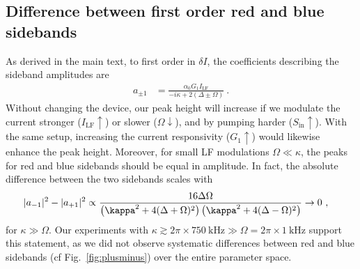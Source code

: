 \subsection{Difference between first order red and blue sidebands}\label{sec:bluered}
% 
As derived in the main text, to first order in $\delta I$, the coefficients describing the sideband amplitudes are
% 
\begin{align}
a_{\pm 1} & = \frac{\alpha_0 G_1 I_\text{LF}}{-i\kappa+2(\Delta\pm\Omega)} \ .
\label{eq:input-output-first}
\end{align}
% 
Without changing the device, our peak height will increase if we modulate the current stronger ($I_\text{LF}\uparrow$) or slower ($\Omega\downarrow$), and by pumping harder ($S_\text{in}\uparrow$).
% 
With the same setup, increasing the current responsivity ($G_1\uparrow$) would likewise enhance the peak height.
% 
Moreover, for small LF modulations $\Omega\ll\kappa$, the peaks for red and blue sidebands should be equal in amplitude.
% 
In fact, the absolute difference between the two sidebands scales with
% 
\begin{align}
\abs{a_{-1}}^2-\abs{a_{+1}}^2 &\propto \frac{16 \Delta \Omega}{\left( \kappa^2+4(\Delta+\Omega)^2 \right)\left( \kappa^2+4(\Delta-\Omega)^2 \right)} \rightarrow 0 \ ,
\end{align}
for $\kappa \gg \Omega$.
% 
Our experiments with $\kappa \gtrsim 2\pi\times\SI{750}{\kilo\hertz} \gg \Omega = 2\pi\times\SI{1}{\kilo\hertz}$ support this statement, as we did not observe systematic differences between red and blue sidebands (cf Fig.~\ref{fig:plusminus}) over the entire parameter space.

